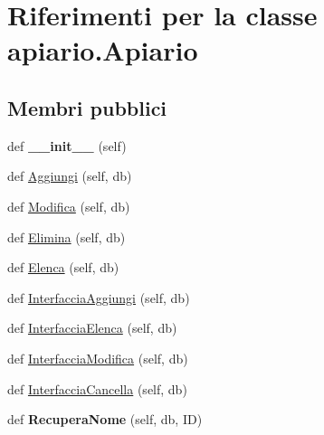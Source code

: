 \hypertarget{classapiario_1_1Apiario}{}\section{Riferimenti per la classe apiario.\+Apiario}
\label{classapiario_1_1Apiario}
\subsection*{Membri pubblici}
\begin{DoxyCompactItemize}
\item 
def {\bfseries \+\_\+\+\_\+init\+\_\+\+\_\+} (self)\hypertarget{classapiario_1_1Apiario_a2388ff9f706e0a39a2fd1e29c7ac1bdb}{}\label{classapiario_1_1Apiario_a2388ff9f706e0a39a2fd1e29c7ac1bdb}

\item 
def \hyperlink{classapiario_1_1Apiario_a1ec949f05e65711cbf25a32a50791c3c}{Aggiungi} (self, db)
\item 
def \hyperlink{classapiario_1_1Apiario_abf2cc07e8590670d699386a2575a9e6a}{Modifica} (self, db)
\item 
def \hyperlink{classapiario_1_1Apiario_a812018e289ab2eb91307fc56fdd2a71f}{Elimina} (self, db)
\item 
def \hyperlink{classapiario_1_1Apiario_ac3f149015b029e8979ca47b15de03a41}{Elenca} (self, db)
\item 
def \hyperlink{classapiario_1_1Apiario_aeabed078a068bb98c5ae56c356d65071}{Interfaccia\+Aggiungi} (self, db)
\item 
def \hyperlink{classapiario_1_1Apiario_a1eb6bcdeaffc4fd78e53aba543d3c6c9}{Interfaccia\+Elenca} (self, db)
\item 
def \hyperlink{classapiario_1_1Apiario_a3c6a4493732e78ce923c77b84e06dc13}{Interfaccia\+Modifica} (self, db)
\item 
def \hyperlink{classapiario_1_1Apiario_a97b4ee9a62a3708b72dfa92bf3db2050}{Interfaccia\+Cancella} (self, db)
\item 
def {\bfseries Recupera\+Nome} (self, db, ID)\hypertarget{classapiario_1_1Apiario_a2a5e0be3c44f2a31e123f9fa62faba6b}{}\label{classapiario_1_1Apiario_a2a5e0be3c44f2a31e123f9fa62faba6b}

\end{DoxyCompactItemize}
